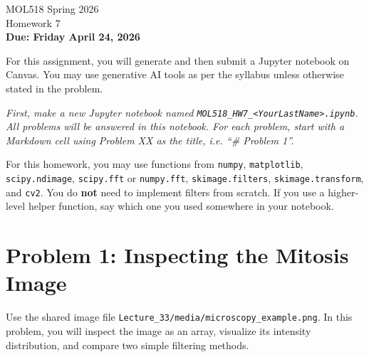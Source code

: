 \documentclass[11pt]{article}
\newcommand{\course}{MOL518 Spring 2026}
\newcommand{\hwnum}{Homework 7}
\newcommand{\duedate}{\textbf{Due: Friday April 24, 2026}}
\begin{document}
\begin{center}
{\Large \course}\\[2pt]
{\large \hwnum}\\[6pt]
\duedate\\[10pt]
\end{center}

For this assignment, you will generate and then submit a Jupyter notebook on Canvas. You may use generative AI tools as per the syllabus unless otherwise stated in the problem.

\vskip 4pt

\noindent \textit{First, make a new Jupyter notebook named \texttt{MOL518\_HW7\_<YourLastName>.ipynb}. All problems will be answered in this notebook. For each problem, start with a Markdown cell using Problem XX as the title, i.e. ``\# Problem 1''.}

\vskip 8pt

\noindent For this homework, you may use functions from \texttt{numpy}, \texttt{matplotlib}, \texttt{scipy.ndimage}, \texttt{scipy.fft} or \texttt{numpy.fft}, \texttt{skimage.filters}, \texttt{skimage.transform}, and \texttt{cv2}. You do \textbf{not} need to implement filters from scratch. If you use a higher-level helper function, say which one you used somewhere in your notebook.

\section*{Problem 1: Inspecting the Mitosis Image}

Use the shared image file \texttt{Lecture\_33/media/microscopy\_example.png}. In this problem, you will inspect the image as an array, visualize its intensity distribution, and compare two simple filtering methods.
\end{document}
